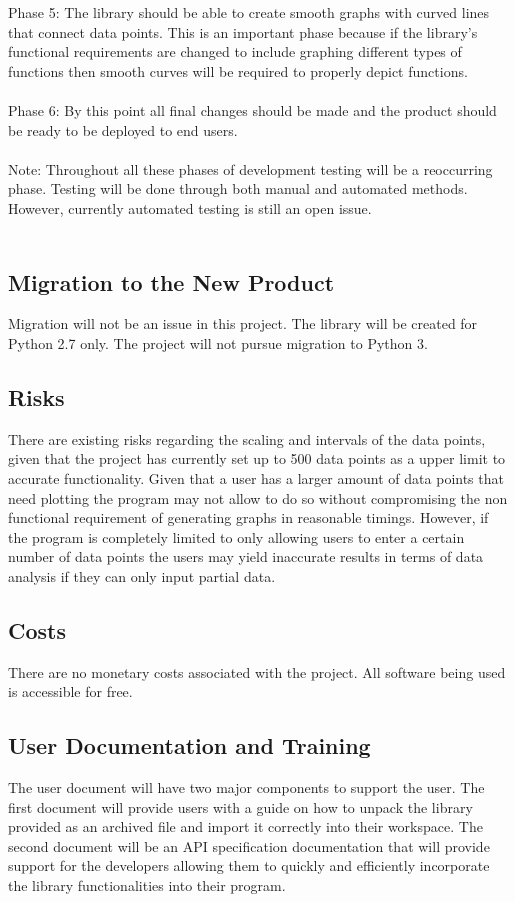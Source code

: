 \documentclass[12pt, titlepage]{article}
\begin{document}
Phase 5: The library should be able to create smooth graphs with curved lines that connect data points. This is an important phase because if the library's functional requirements are changed to include graphing different types of functions then smooth curves will be required to properly depict functions.\\ \\
Phase 6: By this point all final changes should be made and the product should be ready to be deployed to end users.\\ \\
Note: Throughout all these phases of development testing will be a reoccurring phase. Testing will be done through both manual and automated methods. However, currently automated testing is still an open issue. \\ \\

\subsection{Migration to the New Product}
Migration will not be an issue in this project. The library will be created for Python 2.7 only. The project will not pursue migration to Python 3.
\subsection{Risks}
There are existing risks regarding the scaling and intervals of the data points, given that the project has currently set up to 500 data points as a upper limit to accurate functionality. Given that a user has a larger amount of data points that need plotting the program may not allow to do so without compromising the non functional requirement of generating graphs in reasonable timings. However, if the program is completely limited to only allowing users to enter a certain number of data points the users may yield inaccurate results in terms of data analysis if they can only input partial data.
\subsection{Costs}
There are no monetary costs associated with the project. All software being used is accessible for free.
\subsection{User Documentation and Training}
The user document will have two major components to support the user. The first document will provide users with a guide on how to unpack the library provided as an archived file and import it correctly into their workspace. The second document will be an API specification documentation that will provide support for the developers allowing them to quickly and efficiently incorporate the library functionalities into their program.

\end{document}
